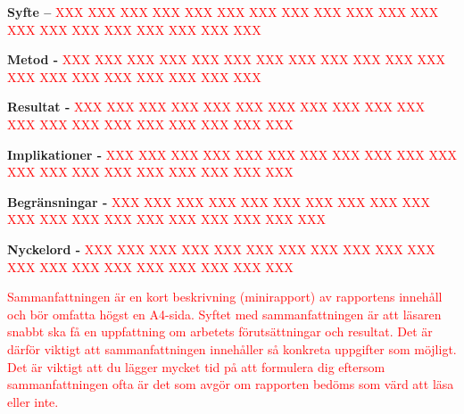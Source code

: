 \noindent\textbf{Syfte –} \textcolor{red}{XXX XXX XXX XXX XXX XXX XXX XXX XXX XXX XXX XXX XXX XXX XXX XXX XXX XXX XXX XXX}

\noindent\textbf{Metod -} \textcolor{red}{XXX XXX XXX XXX XXX XXX XXX XXX XXX XXX XXX XXX XXX XXX XXX XXX XXX XXX XXX XXX}

\noindent\textbf{Resultat -} \textcolor{red}{XXX XXX XXX XXX XXX XXX XXX XXX XXX XXX XXX XXX XXX XXX XXX XXX XXX XXX XXX XXX}

\noindent\textbf{Implikationer -} \textcolor{red}{XXX XXX XXX XXX XXX XXX XXX XXX XXX XXX XXX XXX XXX XXX XXX XXX XXX XXX XXX XXX}

\noindent\textbf{Begränsningar -} \textcolor{red}{XXX XXX XXX XXX XXX XXX XXX XXX XXX XXX XXX XXX XXX XXX XXX XXX XXX XXX XXX XXX}

\noindent\textbf{Nyckelord -} \textcolor{red}{XXX XXX XXX XXX XXX XXX XXX XXX XXX XXX XXX XXX XXX XXX XXX XXX XXX XXX XXX XXX}

\textcolor{red}{Sammanfattningen är en kort beskrivning (minirapport) av rapportens innehåll och bör omfatta högst en A4-sida. Syftet med sammanfattningen är att läsaren snabbt ska få en uppfattning om arbetets förutsättningar och resultat. Det är därför viktigt att sammanfattningen innehåller så konkreta uppgifter som möjligt. Det är viktigt att du lägger mycket tid på att formulera dig eftersom sammanfattningen ofta är det som avgör om rapporten bedöms som värd att läsa eller inte.}